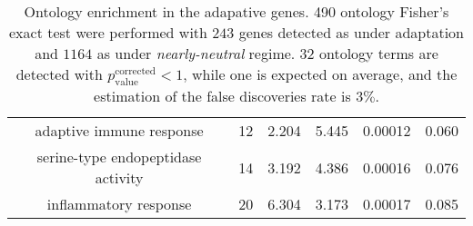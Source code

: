 \documentclass{article}
\begin{document}
\begin{table*}[h!]
\begin{adjustbox}{width = 1\textwidth}
\begin{tabular}{|c|c|c|c|c|c|}
			adaptive immune response & 12 & 2.204 & 5.445 & 0.00012 & 0.060 \\
			serine-type endopeptidase activity & 14 & 3.192 & 4.386 & 0.00016 & 0.076 \\
			inflammatory response & 20 & 6.304 & 3.173 & 0.00017 & 0.085 \\
			\hline
		\end{tabular}
	\end{adjustbox}
	\label{table:ontology}
	\caption{
		Ontology enrichment in the adapative genes.
		490 ontology Fisher's exact test were performed with $243$ genes detected as under adaptation and $1164$ as under \textit{nearly-neutral} regime.
		$32$ ontology terms are detected with $p_{\mathrm{value}}^{\mathrm{corrected}} < 1$, while one is expected on average, and the estimation of the false discoveries rate is $3\%$.
	}
\end{table*}
\end{document}

